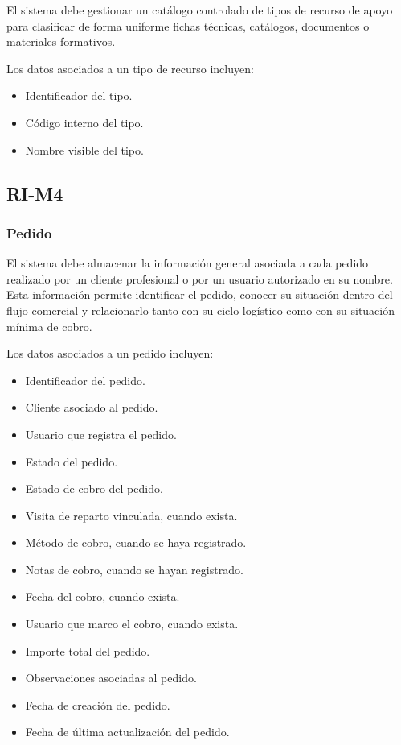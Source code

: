 El sistema debe gestionar un catálogo controlado de tipos de recurso de apoyo para clasificar de forma uniforme fichas técnicas, catálogos, documentos o materiales formativos.

Los datos asociados a un tipo de recurso incluyen:

\begin{itemize}
    \item Identificador del tipo.
    \item Código interno del tipo.
    \item Nombre visible del tipo.
\end{itemize}

\subsection{RI-M4}

\subsubsection*{Pedido}

El sistema debe almacenar la información general asociada a cada pedido realizado por un cliente profesional o por un usuario autorizado en su nombre. Esta información permite identificar el pedido, conocer su situación dentro del flujo comercial y relacionarlo tanto con su ciclo logístico como con su situación mínima de cobro.

Los datos asociados a un pedido incluyen:

\begin{itemize}
    \item Identificador del pedido.
    \item Cliente asociado al pedido.
    \item Usuario que registra el pedido.
    \item Estado del pedido.
    \item Estado de cobro del pedido.
    \item Visita de reparto vinculada, cuando exista.
    \item Método de cobro, cuando se haya registrado.
    \item Notas de cobro, cuando se hayan registrado.
    \item Fecha del cobro, cuando exista.
    \item Usuario que marco el cobro, cuando exista.
    \item Importe total del pedido.
    \item Observaciones asociadas al pedido.
    \item Fecha de creación del pedido.
    \item Fecha de última actualización del pedido.
\end{itemize}

